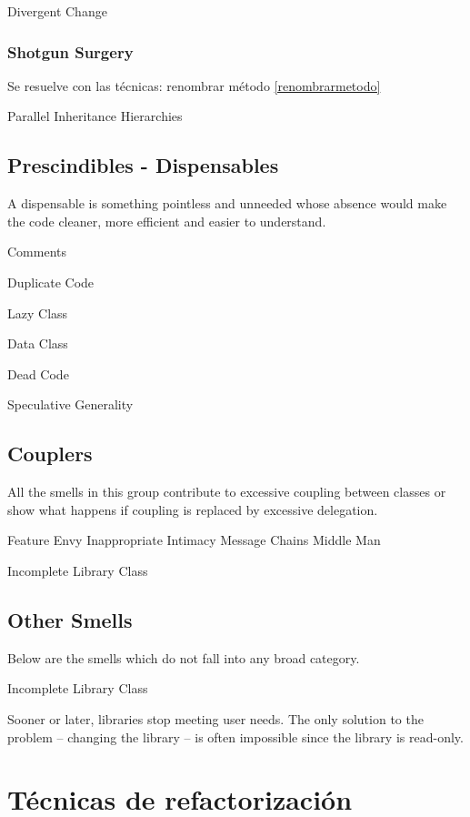 \documentclass[11pt,a4paper,oneside]{book}
\begin{document}
    Divergent Change
    
\subsection{    Shotgun Surgery}

Se resuelve con las técnicas: renombrar método \ref{renombrarmetodo}

    Parallel Inheritance Hierarchies




\section{Prescindibles - Dispensables}

A dispensable is something pointless and unneeded whose absence would make the code cleaner, more efficient and easier to understand.

    Comments
    
    Duplicate Code
    
    Lazy Class

    Data Class

Dead Code

    Speculative Generality



\section{Couplers}

All the smells in this group contribute to excessive coupling between classes or show what happens if coupling is replaced by excessive delegation.

    Feature Envy
    Inappropriate Intimacy
    Message Chains
    Middle Man

    Incomplete Library Class


\section{Other Smells}

Below are the smells which do not fall into any broad category.

Incomplete Library Class

Sooner or later, libraries stop meeting user needs. The only solution to the problem – changing the library – is often impossible since the library is read-only.



\chapter{Técnicas de refactorización}
\end{document}
